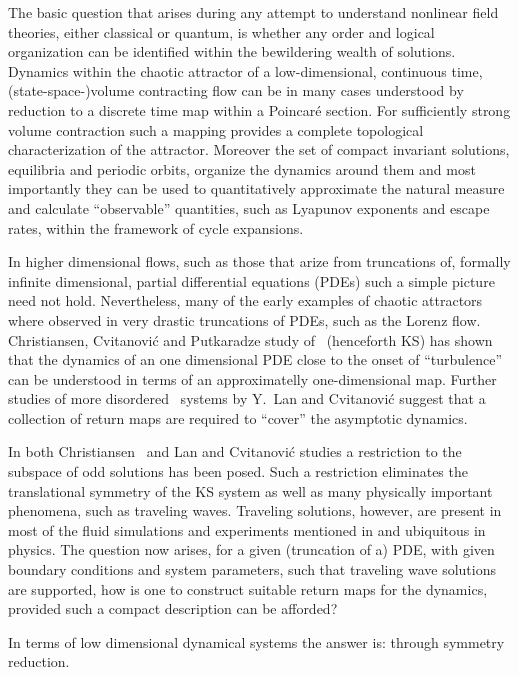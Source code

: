 
The basic question that arises during any attempt to understand nonlinear field theories, 
either classical or quantum, is whether any order and logical organization can be identified
within the bewildering wealth of solutions. Dynamics within the chaotic attractor of
a low-dimensional, continuous time, (state-space-)volume contracting flow can be in many
cases understood by reduction to a discrete time map 
within a Poincar\'e section. For sufficiently strong volume contraction such a mapping provides
a complete topological characterization of the attractor. Moreover the set
of compact invariant solutions, equilibria and periodic orbits, organize the dynamics 
around them and most importantly they can be used to quantitatively approximate the natural
measure and calculate ``observable'' quantities, such as
Lyapunov exponents and escape rates, within the framework of
cycle expansions.

In higher dimensional flows, such as those that arize from truncations of, formally
infinite dimensional, partial differential equations (PDEs) such a simple picture 
need not hold. Nevertheless, many of the early examples of chaotic attractors where
observed in very drastic truncations of PDEs, such as the Lorenz flow.
Christiansen, Cvitanovi\'{c} and Putkaradze study of 
\KSe\ (henceforth KS) has shown that the dynamics of an one dimensional PDE close to the 
onset of ``turbulence'' can be understood in terms of an approximatelly one-dimensional map.
Further studies of more disordered \KS\ systems by Y.~Lan and Cvitanovi\'{c} 
suggest that a collection of return maps are required to ``cover'' the asymptotic dynamics.

In both Christiansen \etal\ and Lan and Cvitanovi\'{c} studies a restriction to the 
subspace of odd solutions has been posed. Such a restriction eliminates the translational 
symmetry of the KS system as well as many physically important phenomena, such as
traveling waves. Traveling solutions, however, are present in most of the fluid
simulations and experiments mentioned in  
and ubiquitous in physics. The question now arises, for a given (truncation of a) PDE, with
given boundary conditions and system parameters, such that
traveling wave solutions are supported, how is one to construct suitable return maps
for the dynamics, provided such a compact description can be afforded?

In terms of low dimensional dynamical systems the answer is: through symmetry reduction. 



